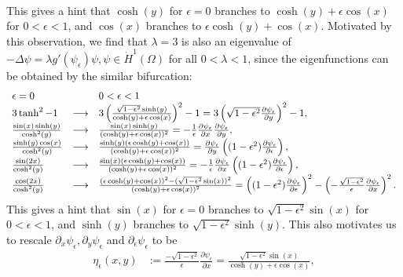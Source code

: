 \documentclass[1 [leqno, 11pt]{amsart}
\numberwithin{equation}{section}
\let\ep=\epsilon
\begin{document}
\begin{CJK*}{GBK}{song}
\begin{align}
\begin{array}{llll}
 \end{array}
\end{align}
This gives a hint that $\cosh(y)$ for $\ep=0$ branches to $\cosh(y)+\epsilon \cos(x)$ for $0<\ep<1$, and $\cos(x)$ branches to $\epsilon \cosh(y) + \cos(x)$.
 Motivated by this observation, we find that $\lambda=3$ is also an eigenvalue of $
-\Delta \psi = \lambda g'(\psi_\epsilon)\psi, \psi\in\dot{H}^1(\Omega)$ for all $0<\lambda<1$, since the eigenfunctions can be obtained by the similar bifurcation:
\begin{equation} \label{bifurcation2}
\begin{array}{llll}
\ep=0&&0<\ep<1\\
3\tanh^2-1&\longrightarrow&3\left({\sqrt{1-\ep^2}\sinh(y)\over \cosh(y)+\epsilon \cos(x)}\right)^2-1=3\left(\sqrt{1 - \epsilon^2}\frac{ \partial \psi_\ep}{\partial y}\right)^2-1,\\
 {\sin(x)\sinh(y)\over \cosh^2(y)}&\longrightarrow& \frac{\sin(x)\sinh(y)}{(\cosh(y)+\epsilon \cos(x))^2}=-{1\over \ep}{\partial \psi_\ep\over\partial x}\frac{ \partial \psi_\ep}{\partial y}, \\
 {\sinh(y)\cos(x)\over \cosh^2(y)}&\longrightarrow&  \frac{\sinh(y)(\ep\cosh(y)+\cos(x))}{(\cosh(y)+\epsilon \cos(x))^2}=\frac{ \partial \psi_\ep}{\partial y}\left((1 - \epsilon^2) \frac{ \partial \psi_\ep}{\partial \ep}\right),\\
 {\sin(2x)\over\cosh^2(y)}&\longrightarrow&  \frac{\sin(x)(\ep\cosh(y)+\cos(x))}{(\cosh(y)+\epsilon \cos(x))^2}=-{1\over \ep}{\partial \psi_\ep\over\partial x}\left((1 - \epsilon^2) \frac{ \partial \psi_\ep}{\partial \ep}\right),\\
 {\cos(2x)\over\cosh^2(y)}&\longrightarrow&  \frac{(\ep\cosh(y)+\cos(x))^2-(\sqrt{1-\ep^2}\sin(x))^2}{(\cosh(y)+\epsilon \cos(x))^2}=\left((1 - \epsilon^2) \frac{ \partial \psi_\ep}{\partial \ep}\right)^2-\left(-{\sqrt{1 - \epsilon^2}\over \ep}{\partial \psi_\ep\over\partial x}\right)^2.
 \end{array}
\end{equation}
This gives a hint that $\sin(x)$ for $\ep=0$ branches to $\sqrt{1-\ep^2}\sin(x)$ for $0<\ep<1$, and $\sinh(y)$ branches to $\sqrt{1-\ep^2}\sinh(y)$.
This also motivates us to rescale   $\partial_x \psi_\ep, \partial_y \psi_\ep$ and $\partial_\epsilon \psi_\ep$ to be
\begin{align}\label{three-kers1}
\eta_\ep(x, y) & :=  \frac{-\sqrt{1 - \epsilon^2}}{\ep} \frac{ \partial \psi_\ep}{\partial x}= \frac{\sqrt{1 - \epsilon^2}\sin(x)}{\cosh(y)+\epsilon \cos(x)},\\\label{three-kers2}

\end{align}
\end{CJK*}
\end{document}
